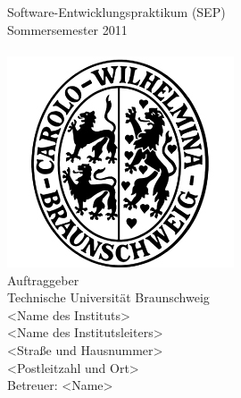 

\thispagestyle{plain}      %

\begin{titlepage}

\begin{center}

{}\\[5ex]

{}\\[5ex]

Software-Entwicklungspraktikum (SEP)\\
Sommersemester 2011\\[6ex]

{}\\[5ex]

\includegraphics[scale=0.8]{bilder/carolo.jpg}\\[5ex]

Auftraggeber\\
Technische Universität Braunschweig\\
<Name des Instituts>\\
<Name des Institutsleiters>\\
<Straße und Hausnummer>\\
<Postleitzahl und Ort>\\[2ex]
Betreuer: <Name>\\[5ex]


\end{center}
\end{titlepage}
